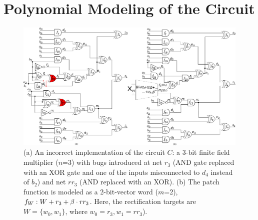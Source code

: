 \section{Polynomial Modeling of the Circuit}\label{sec:pmodel} 

\begin{figure}[hbt]
    \begin{center}
    \includegraphics[scale = 0.34]{mas_3_ddc_mfr.pdf}
    \end{center}
    \caption{  
    (a) An incorrect implementation of the circuit $C$: a 3-bit finite
        field multiplier ($n$=3) with bugs introduced at net $r_3$
        (AND gate replaced with an XOR gate and one of the inputs
        misconnected to $d_4$ instead of $b_2$) and net $rr_3$ (AND
        replaced with an XOR). (b) The patch function is modeled as a
        2-bit-vector word ($m$=2), $f_W: W+r_3+\beta \cdot rr_3$.
        Here, the rectification targets are $W=\{w_0,w_1\}$, where
        $w_0=r_3, w_1=rr_3$).}  
    \label{fig:mas_bug_W}
\end{figure}



